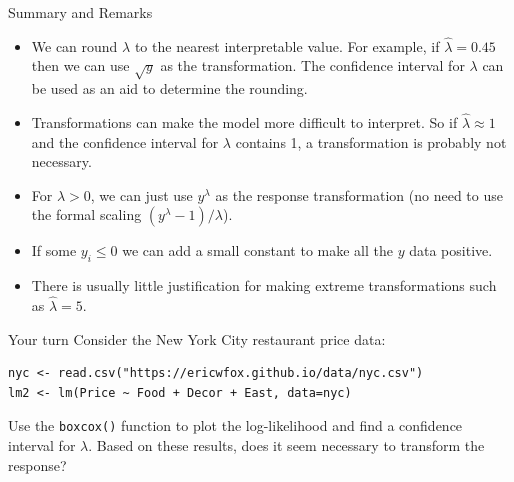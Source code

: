 \documentclass[10pt]{beamer}\usepackage[]{graphicx}\usepackage[]{color}
\begin{document}
\begin{frame}{Summary and Remarks}
\begin{itemize}
\item We can round $\lambda$ to the nearest interpretable value.  For example, if $\hat{\lambda} = 0.45$  then we can use  $\sqrt{y}$ as the transformation.  The confidence interval for $\lambda$ can be used as an aid to determine the rounding.
\vspace{5pt}
\item Transformations can make the model more difficult to interpret.  So if $\hat{\lambda} \approx 1$ and the confidence interval for $\lambda$ contains 1, a transformation is probably not necessary.
\vspace{5pt}
\item For $\lambda > 0$, we can just use $y^{\lambda}$ as the response transformation (no need to use the formal scaling $(y^{\lambda}-1)/\lambda$).
\vspace{5pt}
\item If some $y_i \leq 0$ we can add a small constant to make all the $y$ data positive.
\vspace{5pt}
\item There is usually little justification for making extreme transformations such as $\hat{\lambda} = 5$.
\end{itemize}
\end{frame}

\begin{frame}[fragile]{Your turn}
Consider the New York City restaurant price data:
\begin{verbatim}
nyc <- read.csv("https://ericwfox.github.io/data/nyc.csv")
lm2 <- lm(Price ~ Food + Decor + East, data=nyc)
\end{verbatim}
Use the \texttt{boxcox()} function to plot the log-likelihood and find a confidence interval for $\lambda$.  Based on these results, does it seem necessary to transform the response?
\end{frame}
\end{document}
